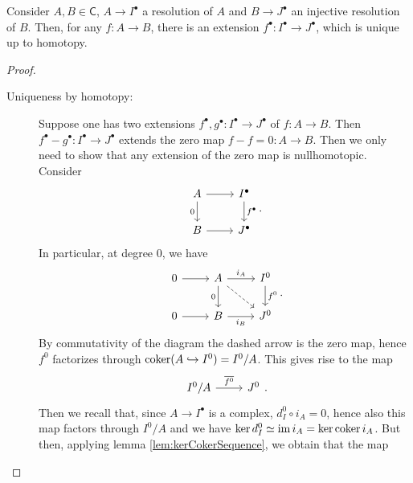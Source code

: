 \documentclass[../Main]{subfiles}
\begin{document}
\begin{prop}[]\label{prop:ExistanceUniquenessLift}
	Consider $A, B \in \mathsf{C}$,
	$A \to  I^\bullet$ a resolution of $A$
	and $B \to  J^\bullet$ an injective resolution of $B$.
	Then, for any $f\colon A \to B$, there is an extension
	$f^\bullet\colon I^\bullet \to J^\bullet$,
	which is unique up to homotopy.
\end{prop}
\begin{proof}\leavevmode\vspace{-.2\baselineskip}
	\begin{description}
		\item[Uniqueness by homotopy:]
	Suppose one has two extensions $f^\bullet, g^\bullet\colon I^\bullet \to J^\bullet$
	of $f\colon A \to B$.
	Then $f^\bullet - g^\bullet\colon I^\bullet \to J^\bullet$
	extends the zero map $f-f = 0\colon A \to B$.
	Then we only need to show that any extension of the zero map
	is nullhomotopic.
	Consider
	\begin{equation}
	\begin{tikzcd}
		A \arrow[d, "0"', rightarrow] \arrow[r, "", rightarrow] &
		I^\bullet \arrow[d, "f^\bullet", rightarrow] \\
		B \arrow[r, "", rightarrow] &
		J^\bullet
	\end{tikzcd}
	.\end{equation} 
	In particular, at degree $0$, we have
	\begin{equation}
	\begin{tikzcd}
		0 \arrow[r, "", rightarrow] &
		A \arrow[d, "0"', rightarrow] \arrow[r, "i_A", rightarrow] \arrow[rd, "", dashrightarrow] &
		I^0 \arrow[d, "f^0", rightarrow] \\
		0 \arrow[r, "", rightarrow] &
		B \arrow[r, "i_B"', rightarrow] &
		J^0
	\end{tikzcd}
	.\end{equation} 
	By commutativity of the diagram the dashed arrow is the zero map,
	hence $f^0$ factorizes through
	$\operatorname{coker} (A \hookrightarrow I^0) = I^0/A$.
	This gives rise to the map
	\begin{equation}
	\begin{tikzcd}
		I^0/A \arrow[r, "\overline{f^0}", rightarrow] &
		J^0
	\end{tikzcd}
	.\end{equation} 
	Then we recall that, since $A \to I^\bullet$ is a complex, $d_I^0 \circ i_A = 0$,
	hence also this map factors through $I^0/A$ and we have 
	$\ker d^0_I \simeq \operatorname{im} i_A = \ker \operatorname{coker} i_A$.
	But then, applying lemma \ref{lem:kerCokerSequence}, we obtain that the map

\end{description}
\end{proof}
\end{document}
